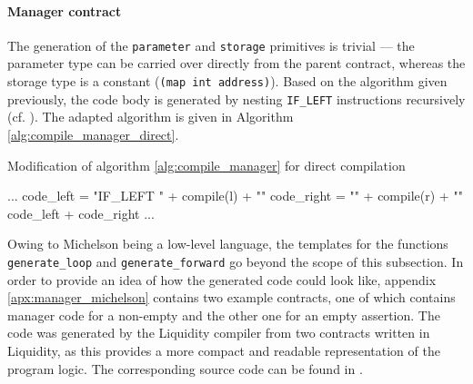 \paragraph{Manager contract}
The generation of the \texttt{parameter} and \texttt{storage} primitives is trivial --- the parameter type can be carried over directly from the parent contract, whereas the storage type is a constant (\texttt{(map int address)}). Based on the algorithm given previously, the code body is generated by nesting \texttt{IF\_LEFT} instructions recursively (cf. ). The adapted algorithm is given in Algorithm \ref{alg:compile_manager_direct}.
\begin{algorithm}
\caption{Modification of algorithm \ref{alg:compile_manager} for direct compilation}\label{alg:compile_manager_direct}
	\begin{algorithmic}[0]
	\State ...
	 
	\State code\_left = "IF\_LEFT {" + compile(l) + "}"
	\State code\_right = "{" + compile(r) + "}"
	\State \Return code\_left + code\_right
	\EndIf
	\State ...
	\EndFunction
	\end{algorithmic}
\end{algorithm}

Owing to Michelson being a low-level language, the templates for the functions \texttt{generate\_loop} and \texttt{generate\_forward} go beyond the scope of this subsection. In order to provide an idea of how the generated code could look like, appendix \ref{apx:manager_michelson} contains two example contracts, one of which contains manager code for a non-empty and the other one for an empty assertion. The code was generated by the Liquidity compiler from two contracts written in Liquidity, as this provides a more compact and readable representation of the program logic. The corresponding source code can be found in .


